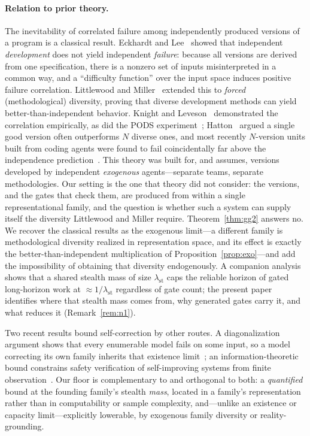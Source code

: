 \documentclass[11pt]{article}
\theoremstyle{definition}
\theoremstyle{remark}
\newcommand{\lst}{\lambda_{\mathrm{st}}}
\begin{document}
\paragraph{Relation to prior theory.}
The inevitability of correlated failure among independently produced versions of a program is a
classical result. Eckhardt and Lee~\cite{eckhardt1985} showed that independent \emph{development}
does not yield independent \emph{failure}: because all versions are derived from one specification,
there is a nonzero set of inputs misinterpreted in a common way, and a ``difficulty function'' over
the input space induces positive failure correlation. Littlewood and Miller~\cite{littlewood1989}
extended this to \emph{forced} (methodological) diversity, proving that diverse development methods
can yield better-than-independent behavior. Knight and Leveson~\cite{knight1986,brilliant1990}
demonstrated the correlation empirically, as did the PODS experiment~\cite{bishop1988}; Hatton~\cite{hatton1997}
argued a single good version often outperforms $N$ diverse ones, and most recently $N$-version units
built from coding agents were found to fail coincidentally far above the independence
prediction~\cite{ron2026}. This theory was built for, and assumes, versions developed
by independent \emph{exogenous} agents---separate teams, separate methodologies. Our setting is the
one that theory did not consider: the versions, and the gates that check them, are produced from
within a single representational family, and the question is whether such a system can supply itself
the diversity Littlewood and Miller require. Theorem~\ref{thm:gg2} answers no. We recover the
classical results as the exogenous limit---a different family is methodological diversity realized in
representation space, and its effect is exactly the better-than-independent multiplication of
Proposition~\ref{prop:exo}---and add the impossibility of obtaining that diversity endogenously.
A companion analysis~\cite{matijasevic2026} shows that a shared stealth mass of size $\lst$ caps the
reliable horizon of gated long-horizon work at $\approx 1/\lst$ regardless of gate count; the present
paper identifies where that stealth mass comes from, why generated gates carry it, and what reduces
it (Remark~\ref{rem:n1}).

Two recent results bound self-correction by other routes. A diagonalization argument shows that every
enumerable model fails on some input, so a model correcting its own family inherits that existence
limit~\cite{fundlimits2025}; an information-theoretic bound constrains safety verification of
self-improving systems from finite observation~\cite{infotheoretic2026}. Our floor is complementary to
and orthogonal to both: a \emph{quantified} bound at the founding family's stealth \emph{mass}, located
in a family's representation rather than in computability or sample complexity, and---unlike an
existence or capacity limit---explicitly lowerable, by exogenous family diversity or reality-grounding.
\end{document}
